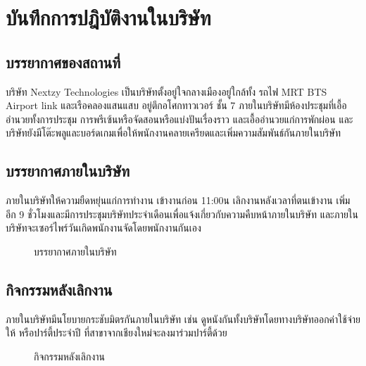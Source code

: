 \chapter{บันทึกการปฎิบัติงานในบริษัท}
\label{chapter:atmosphere}
\section{บรรยากาศของสถานที่}
บริษัท Nextzy Technologies เป็นบริษัทตั้งอยู่ใจกลางเมืองอยู่ใกล้ทั้ง รถไฟ MRT BTS Airport link และเรือคลองแสนแสบ
อยู่ตึกอโศกทาวเวอร์ ชั้น 7 ภายในบริษัทมีห้องประชุมที่เอื้ออำนวยทั้งการประชุม การพรีเซ้นหรือจัดสอนหรือแบ่งปันเรื่องราว 
และเอื้ออำนวยแก่การพักผ่อน และบริษัทยังมีโต๊ะพลูและบอร์ดเกมเพื่อให้พนักงานคลายเครียดและเพิ่มความสัมพันธ์กันภายในบริษัท
\section{บรรยากาศภายในบริษัท}
ภายในบริษัทให้ความยืดหยุ่นแก่การทำงาน เข้างานก่อน 11:00น เลิกงานหลังเวลาที่ตนเข้างาน เพิ่มอีก 9 ชั่วโมงและมีการประชุมบริษัทประจำเดือนเพื่อแจ้งเกี่ยวกับความคืบหน้าภายในบริษัท 
และภายในบริษัทจะเซอร์ไพร์วันเกิดพนักงานจัดโดยพนักงานกันเอง 
\\
\begin{figure}[!htbp]
      \centering
     
\end{figure}
\begin{figure}[!htbp]
      \centering
      \caption{บรรยากาศภายในบริษัท}
\end{figure}
\newpage
\section{กิจกรรมหลังเลิกงาน}
 ภายในบริษัทมีนโยบายกระชับมิตรกันภายในบริษัท เช่น ดูหนังกันทั้งบริษัทโดยทางบริษัทออกค่าใช้จ่ายให้ หรือปาร์ตี้ประจำปี ที่สาขาจากเชียงใหม่จะลงมาร่วมปาร์ตี้ด้วย
\begin{figure}[!htbp]
      \centering
      \caption{กิจกรรมหลังเลิกงาน}
\end{figure}
